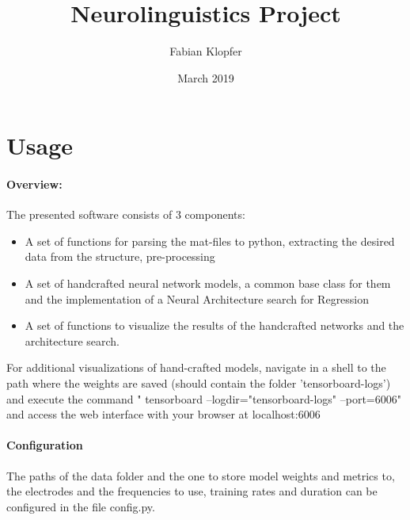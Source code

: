 \documentclass[a4paper]{report}
\title{Neurolinguistics Project}
\author{Fabian Klopfer}
\date{March 2019}
\begin{document}
\section{Usage}
    \paragraph{Overview:}
    The presented software consists of 3 components:
    \begin{itemize}
        \item A set of functions for parsing the mat-files to python, extracting the desired data from the structure,
            pre-processing
        \item A set of handcrafted neural network models, a common base class for them and the implementation of a Neural
            Architecture search for Regression
        \item A set of functions to visualize the results of the handcrafted networks and the architecture search.
    \end{itemize}
    For additional visualizations of hand-crafted models, navigate in a shell to the path where the weights are saved (should contain the folder 'tensorboard-logs')
    and execute the command " tensorboard --logdir="tensorboard-logs" --port=6006" and access the web interface with your browser at localhost:6006
    \paragraph{Configuration}
    The paths of the data folder and the one to store model weights and metrics to, the electrodes and the frequencies to
    use, training rates and duration can be configured in the file config.py. \\
\end{document}
